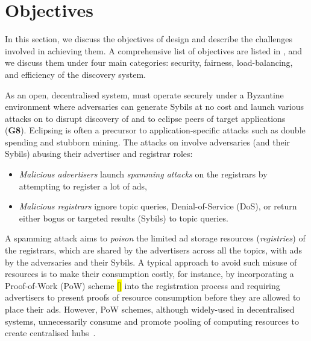 \section{Objectives}
\label{sec:objectives}

In this section, we discuss the objectives of \sysname design and describe the challenges involved in achieving them. A comprehensive list of objectives are listed in , and we discuss them under four main categories: security, fairness, load-balancing, and efficiency of the discovery system. 

 As an open, decentralised system, \sysname must operate securely under a Byzantine environment where adversaries can generate Sybils at no cost and launch various attacks on \sysname to disrupt discovery of and to eclipse peers of target applications (\textbf{G8}). Eclipsing is often a precursor to application-specific attacks such as double spending and stubborn mining. The attacks on \sysname involve adversaries (and their Sybils) abusing their advertiser and registrar roles: 



\begin{itemize}
 \item \textit{Malicious advertisers} launch \textit{spamming attacks} on the registrars by attempting to register a lot of ads, 
 \item \textit{Malicious registrars} ignore topic queries, \ie Denial-of-Service (DoS), or return either bogus or targeted results (\eg  Sybils) to topic queries.
\end{itemize}

A spamming attack aims to \textit{poison} the limited ad storage resources (\ie \textit{registries}) of the registrars, which are shared by the advertisers across all the topics, with ads by the adversaries and their Sybils. A typical approach to avoid such misuse of resources is to make their consumption costly, for instance, by incorporating a Proof-of-Work (PoW) scheme \hl{[]} into the registration process and requiring advertisers to present proofs of resource consumption before they are allowed to place their ads. However, PoW schemes, although widely-used in decentralised systems, unnecessarily consume and promote pooling of computing resources to create centralised hubs~\cite{gervais2014bitcoin}. 

